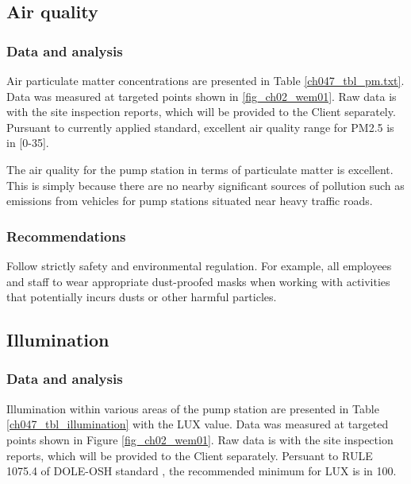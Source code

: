 \subsection{Air quality}\label{aq01}

\subsubsection{Data and analysis}
Air particulate matter concentrations are presented in Table \ref{ch047_tbl_pm.txt}. Data was measured at targeted points shown in \ref{fig_ch02_wem01}. Raw data is with the site inspection reports, which will be provided to the Client separately. Pursuant to currently applied standard, excellent air quality range for PM2.5 is in [0-35].



The air quality for the pump station in terms of particulate matter is excellent. This is simply because there are no nearby significant sources of pollution such as emissions from vehicles for pump stations situated near heavy traffic roads.


\subsubsection{Recommendations}

Follow strictly safety and environmental regulation. For example, all employees and staff to wear appropriate dust-proofed masks when working with activities that potentially incurs dusts or other harmful particles.



\subsection{Illumination}\label{aq03}
\subsubsection{Data and analysis}
Illumination within various areas of the pump station are presented in Table \ref{ch047_tbl_illumination} with the LUX value. Data was measured at targeted points shown in Figure \ref{fig_ch02_wem01}. Raw data is with the site inspection reports, which will be provided to the Client separately. Persuant to RULE 1075.4 of DOLE-OSH standard \cite{DOLE2016}, the recommended minimum for LUX is in 100.

